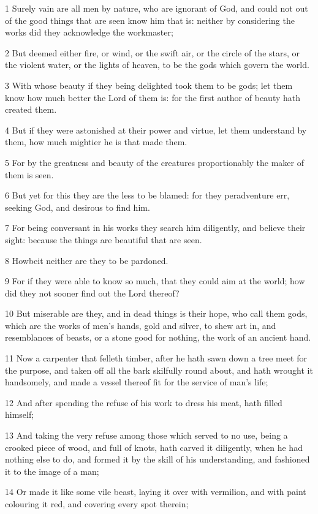 \par 1 Surely vain are all men by nature, who are ignorant of God, and could not out of the good things that are seen know him that is: neither by considering the works did they acknowledge the workmaster;
\par 2 But deemed either fire, or wind, or the swift air, or the circle of the stars, or the violent water, or the lights of heaven, to be the gods which govern the world.
\par 3 With whose beauty if they being delighted took them to be gods; let them know how much better the Lord of them is: for the first author of beauty hath created them.
\par 4 But if they were astonished at their power and virtue, let them understand by them, how much mightier he is that made them.
\par 5 For by the greatness and beauty of the creatures proportionably the maker of them is seen.
\par 6 But yet for this they are the less to be blamed: for they peradventure err, seeking God, and desirous to find him.
\par 7 For being conversant in his works they search him diligently, and believe their sight: because the things are beautiful that are seen.
\par 8 Howbeit neither are they to be pardoned.
\par 9 For if they were able to know so much, that they could aim at the world; how did they not sooner find out the Lord thereof?
\par 10 But miserable are they, and in dead things is their hope, who call them gods, which are the works of men's hands, gold and silver, to shew art in, and resemblances of beasts, or a stone good for nothing, the work of an ancient hand.
\par 11 Now a carpenter that felleth timber, after he hath sawn down a tree meet for the purpose, and taken off all the bark skilfully round about, and hath wrought it handsomely, and made a vessel thereof fit for the service of man's life;
\par 12 And after spending the refuse of his work to dress his meat, hath filled himself;
\par 13 And taking the very refuse among those which served to no use, being a crooked piece of wood, and full of knots, hath carved it diligently, when he had nothing else to do, and formed it by the skill of his understanding, and fashioned it to the image of a man;
\par 14 Or made it like some vile beast, laying it over with vermilion, and with paint colouring it red, and covering every spot therein;
